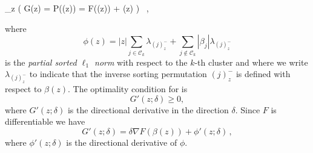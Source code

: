 \begin{problem}
\label{pb:cluster-problem}
\min_{z \in {}} \Big(
G(z) = P(\beta(z))  = F(\beta(z)) + \phi(z)
\Big) \,  ,
\end{problem}
where
\[
  \phi(z) = |z| \sum_{j \in \mathcal{C}_k} \lambda_{(j)^-_z}
  + \sum_{j \notin \mathcal{C}_k} |\beta_j| \lambda_{(j)^-_z}
\]
is the \emph{partial sorted \(\ell_1\) norm} with respect to the \(k\)-th cluster and where we write \(\lambda_{(j)^-_z}\) to indicate that the inverse sorting permutation \((j)^-_z\)
is defined with respect to \(\beta(z)\).
The optimality condition for  is
\[
  G'(z; \delta) \geq 0,
\]
where $G'(z; \delta) $ is the directional derivative in the direction $\delta$.
Since \(F\) is differentiable we have
\[
  G'(z; \delta)  = \delta \nabla F(\beta(z)) + \phi'(z; \delta) \, ,
\]
where \(\phi'(z; \delta)\) is the directional derivative of $\phi$.



